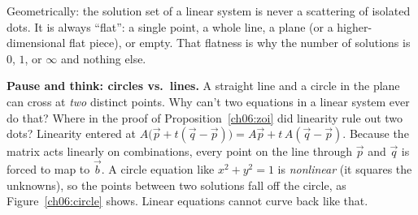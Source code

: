 \begin{intuitionbox}
Geometrically: the solution set of a linear system is never a scattering of
isolated dots. It is always ``flat'': a single point, a whole line, a
plane (or a higher-dimensional flat piece), or empty. That flatness is why
the number of solutions is $0$, $1$, or $\infty$ and nothing else.
\end{intuitionbox}

\begin{recoverybox}
\textbf{Pause and think: circles vs.\ lines.}
A straight line and a circle in the plane can cross at \emph{two} distinct
points. Why can't two equations in a linear system ever do that? Where in
the proof of Proposition~\ref{ch06:zoi} did linearity rule out two dots?
Linearity entered at $A\bigl(\vec p + t(\vec q - \vec p)\bigr) = A\vec p + t\,A(\vec q - \vec p)$.
Because the matrix acts linearly on combinations, every point on the line
through $\vec p$ and $\vec q$ is forced to map to $\vec b$. A circle equation
like $x^2 + y^2 = 1$ is \emph{nonlinear} (it squares the unknowns), so the
points between two solutions fall off the circle, as
Figure~\ref{ch06:circle} shows. Linear equations cannot curve back like that.
\end{recoverybox}

